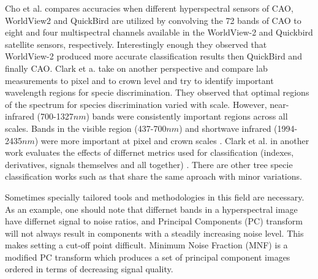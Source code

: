 \documentclass[remotesensing,article,accept,moreauthors,pdftex,12pt,a4paper]{mdpi}
\begin{document}
Cho et al. \cite{cho2012mapping} compares accuracies when different hyperspectral sensors of CAO, WorldView2 and QuickBird are utilized by convolving the 72 bands of CAO to eight and four multispectral channels available in the WorldView-2 and Quickbird satellite sensors, respectively. Interestingly enough they observed that WorldView-2 produced more accurate classification results then QuickBird and finally CAO. Clark et a. take on another perspective and compare lab measurements to pixel and to crown level \cite{clark2005hyperspectral} and try to identify important wavelength regions for specie discrimination. They observed that optimal regions of the spectrum for species discrimination varied with scale. However, near-infrared (700-1327$nm$) bands were consistently important regions across all scales. Bands in the visible region (437-700$nm$) and shortwave infrared (1994-2435$nm$) were more important at pixel and crown scales  \cite{clark2005hyperspectral}. Clark et al.  in another work evaluates the effects of differnet metrics used for classification (indexes, derivatives, signals themselves and all together) \cite{clark2012species}. There are other tree specie classification works such as \cite{dalponte2014tree, feret2012semi, feret2013tree, ghosh2014framework, immitzer2012tree, naidoo2012classification, ustin2009retrieval} that share the same aproach with minor variations. 

Sometimes specially tailored tools and methodologies in this field are necessary. As an example, one should note that differnet bands in a hyperspectral image have differnet signal to noise ratios, and Principal Components (PC) transform will not always result in components with a steadily increasing noise level. This makes setting a cut-off point difficult. Minimum Noise Fraction (MNF)   \cite{green1988transformation} is a modified PC transform which produces a set of principal component images ordered in terms of decreasing signal quality. 
\end{document}

